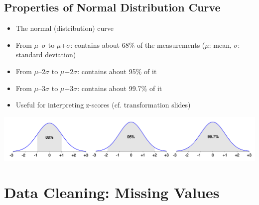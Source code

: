 \documentclass[11pt]{article}
\theoremstyle{definition}
\begin{document}
\subsection{Properties of Normal Distribution Curve}
\begin{itemize}
    \item The normal (distribution) curve
    \item From $\mu$–$\sigma$ to $\mu$+$\sigma$: contains about 68\% of the measurements
    ($\mu$: mean, $\sigma$: standard deviation)
    \item From $\mu$–2$\sigma$ to $\mu$+2$\sigma$: contains about 95\% of it
    \item From $\mu$–3$\sigma$ to $\mu$+3$\sigma$: contains about 99.7\% of it
    \item Useful for interpreting z-scores (cf. transformation slides)
\end{itemize}
\includegraphics[width=\textwidth]{14.png}
\section{Data Cleaning: Missing Values}
\end{document}

